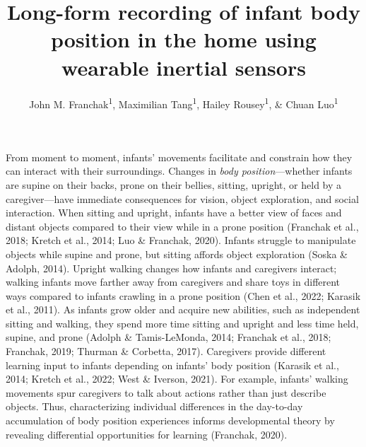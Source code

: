 \documentclass[
  man]{apa6}
\title{Long-form recording of infant body position in the home using wearable inertial sensors}
\author{John M. Franchak\textsuperscript{1}, Maximilian Tang\textsuperscript{1}, Hailey Rousey\textsuperscript{1}, \& Chuan Luo\textsuperscript{1}}
\date{}
\affiliation{\phantom{0}}
\begin{document}
\maketitle

From moment to moment, infants' movements facilitate and constrain how they can interact with their surroundings. Changes in \emph{body position}---whether infants are supine on their backs, prone on their bellies, sitting, upright, or held by a caregiver---have immediate consequences for vision, object exploration, and social interaction. When sitting and upright, infants have a better view of faces and distant objects compared to their view while in a prone position (Franchak et al., 2018; Kretch et al., 2014; Luo \& Franchak, 2020). Infants struggle to manipulate objects while supine and prone, but sitting affords object exploration (Soska \& Adolph, 2014). Upright walking changes how infants and caregivers interact; walking infants move farther away from caregivers and share toys in different ways compared to infants crawling in a prone position (Chen et al., 2022; Karasik et al., 2011). As infants grow older and acquire new abilities, such as independent sitting and walking, they spend more time sitting and upright and less time held, supine, and prone (Adolph \& Tamis-LeMonda, 2014; Franchak et al., 2018; Franchak, 2019; Thurman \& Corbetta, 2017). Caregivers provide different learning input to infants depending on infants' body position (Karasik et al., 2014; Kretch et al., 2022; West \& Iverson, 2021). For example, infants' walking movements spur caregivers to talk about actions rather than just describe objects. Thus, characterizing individual differences in the day-to-day accumulation of body position experiences informs developmental theory by revealing differential opportunities for learning (Franchak, 2020).
\end{document}
